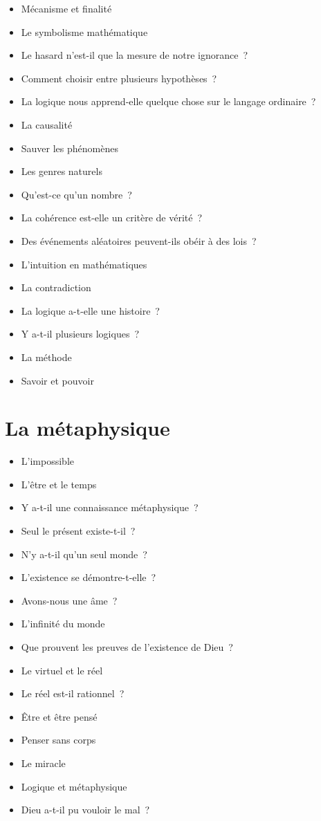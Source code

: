 \documentclass[a4paper,11pt]{article}
\newenvironment{liste}{\begin{itemize}}{\end{itemize}}
\begin{document}
\begin{liste}
\item Mécanisme et finalité
\item Le symbolisme mathématique
\item Le hasard n'est-il que la mesure de notre ignorance~?
\item Comment choisir entre plusieurs hypothèses~?
\item La logique nous apprend-elle quelque chose sur le langage
  ordinaire~?
\item La causalité
\item Sauver les phénomènes
\item Les genres naturels
\item Qu'est-ce qu'un nombre~?
\item La cohérence est-elle un critère de vérité~?
\item Des événements aléatoires peuvent-ils obéir à des lois~?
\item L'intuition en mathématiques
\item La contradiction
\item La logique a-t-elle une histoire~?
\item Y a-t-il plusieurs logiques~?
\item La méthode
\item Savoir et pouvoir
\end{liste}


\section{La métaphysique}

\begin{liste}
\item L'impossible
\item L'être et le temps
\item Y a-t-il une connaissance métaphysique~?
\item Seul le présent existe-t-il~?
\item N'y a-t-il qu'un seul monde~?
\item L'existence se démontre-t-elle~?
\item Avons-nous une âme~?
\item L'infinité du monde
\item Que prouvent les preuves de l'existence de Dieu~?
\item Le virtuel et le réel
\item Le réel est-il rationnel~?
\item Être et être pensé
\item Penser sans corps
\item Le miracle
\item Logique et métaphysique
\item Dieu a-t-il pu vouloir le mal~?
\end{liste}
\end{document}
